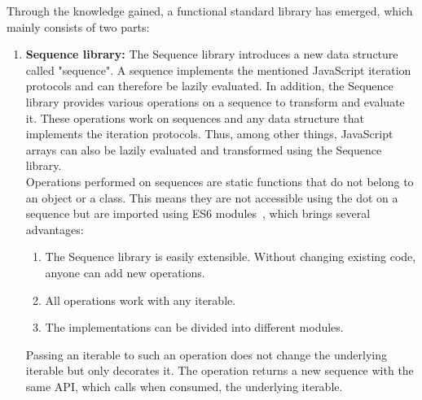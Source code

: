Through the knowledge gained, a functional standard library has emerged, which
mainly consists of two parts:\\
\begin{enumerate}
  \item \textbf{Sequence library:} The Sequence library introduces a new data
    structure called "sequence". A sequence implements the mentioned JavaScript
    iteration protocols and can therefore be lazily evaluated. In addition, the
    Sequence library provides various operations on a sequence to transform and
    evaluate it. These operations work on sequences and any data structure that
    implements the iteration protocols. Thus, among other things, JavaScript
    arrays can also be lazily evaluated and transformed using the Sequence
    library.\\
    Operations performed on sequences are static functions that do not belong
    to an object or a class. This means they are not accessible using the dot
    on a sequence but are imported using ES6 modules~\cite{mdn_modules_2023},
    which brings several advantages:
      \begin{enumerate}
        \item The Sequence library is easily extensible. Without changing existing
          code, anyone can add new operations.
        \item All operations work with any iterable.
        \item The implementations can be divided into different modules.
      \end{enumerate}
  Passing an iterable to such an operation does not change the underlying
  iterable but only decorates it. The operation returns a new sequence with the
  same API, which calls when consumed, the underlying iterable.


\end{enumerate}
